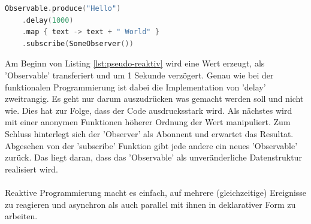 \begin{lstlisting}[caption={Pseudocode reaktive Programmierung}, label={lst:pseudo-reaktiv}, language=Kotlin]
Observable.produce("Hello")
	.delay(1000)
	.map { text -> text + " World" }
	.subscribe(SomeObserver())
\end{lstlisting}
\bigskip
Am Beginn von Listing 
\ref{lst:pseudo-reaktiv}
wird eine Wert erzeugt, als 'Observable' transferiert und um 1 Sekunde verzögert. Genau wie bei der funktionalen Programmierung ist dabei die Implementation von 'delay' zweitrangig. Es geht nur darum auszudrücken was gemacht werden soll und nicht wie. Dies hat zur Folge, dass der Code ausdrucksstark wird. Als nächstes wird mit einer anonymen Funktionen höherer Ordnung der Wert manipuliert. Zum Schluss hinterlegt sich der 'Observer' als Abonnent und erwartet das Resultat. Abgesehen von der 'subscribe' Funktion gibt jede andere ein neues 'Observable' zurück. Das liegt daran, dass das 'Observable' als unveränderliche Datenstruktur realisiert wird.
\\\\
Reaktive Programmierung macht es einfach, auf mehrere (gleichzeitige) Ereignisse zu reagieren und asynchron als auch parallel mit ihnen in deklarativer Form zu arbeiten. 


